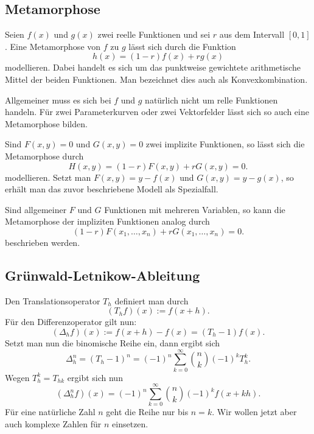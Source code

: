 \documentclass[a4paper,10pt,fleqn,twocolumn,twoside]{scrartcl}
\numberwithin{equation}{section}
\theoremstyle{rmbox}
\begin{document}
\subsection{Metamorphose}

Seien $f(x)$ und $g(x)$ zwei reelle Funktionen und sei $r$ aus
dem Intervall $[0,1]$. Eine Metamorphose von $f$ zu $g$
lässt sich durch die Funktion
\begin{equation}
h(x) = (1-r)f(x)+rg(x)
\end{equation}
modellieren. Dabei handelt es sich um das punktweise gewichtete
arithmetische Mittel der beiden Funktionen. Man bezeichnet dies
auch als Konvexkombination.

Allgemeiner muss es sich bei $f$ und $g$ natürlich nicht um relle
Funktionen handeln. Für zwei Parameterkurven oder  zwei Vektorfelder
lässt sich so auch eine Metamorphose bilden.

Sind $F(x,y)=0$ und $G(x,y)=0$ zwei implizite Funktionen, so
lässt sich die Metamorphose durch
\begin{equation}
H(x,y) = (1-r)F(x,y)+rG(x,y) = 0.
\end{equation}
modellieren. Setzt man $F(x,y)=y-f(x)$ und $G(x,y)=y-g(x)$,
so erhält man das zuvor beschriebene Modell als Spezialfall.

Sind allgemeiner $F$ und $G$ Funktionen mit mehreren
Variablen, so kann die Metamorphose der impliziten Funktionen
analog durch
\begin{equation}
(1-r)F(x_1,\ldots,x_n)+rG(x_1,\ldots,x_n)=0.
\end{equation}
beschrieben werden.

\subsection{Grünwald-Letnikow-Ableitung}

Den Translationsoperator $T_h$ definiert man durch
\begin{equation}
(T_h f)(x) := f(x+h).
\end{equation}
Für den Differenzoperator gilt nun:
\begin{equation}
(\Delta_h f)(x) := f(x+h)-f(x) = (T_h-1) f(x).
\end{equation}
Setzt man nun die binomische Reihe ein, dann ergibt sich%
\begin{equation}
\Delta_h^n = (T_h-1)^n
= (-1)^n \sum_{k=0}^\infty \binom{n}{k} (-1)^k T_h^k.
\end{equation}
Wegen $T_h^k = T_{hk}$ ergibt sich nun
\begin{equation}
(\Delta_h^n f)(x) = (-1)^n \sum_{k=0}^\infty \binom{n}{k} (-1)^k f(x+kh).
\end{equation}
Für eine natürliche Zahl $n$ geht die Reihe nur bis $n=k$. Wir wollen
jetzt aber auch komplexe Zahlen für $n$ einsetzen.
\end{document}
